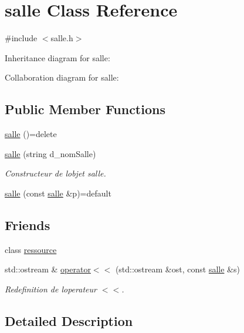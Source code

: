 \hypertarget{classsalle}{}\section{salle Class Reference}
\label{classsalle}


{\ttfamily \#include $<$salle.\+h$>$}



Inheritance diagram for salle\+:


Collaboration diagram for salle\+:
\subsection*{Public Member Functions}
\begin{DoxyCompactItemize}
\item 
\hyperlink{classsalle_afff557d088f3a88fea869c69c4a27034}{salle} ()=delete
\item 
\hyperlink{classsalle_a31f6417c7498ad8c11ca6d4a5a7fe756}{salle} (string d\+\_\+nom\+Salle)
\begin{DoxyCompactList}\small\item\em Constructeur de l\textquotesingle{}objet salle. \end{DoxyCompactList}\item 
\hyperlink{classsalle_ab6c4208e0e55d42c67880fa02e25f245}{salle} (const \hyperlink{classsalle}{salle} \&p)=default
\end{DoxyCompactItemize}
\subsection*{Friends}
\begin{DoxyCompactItemize}
\item 
class \hyperlink{classsalle_a24d55629351652ce27831ce9ef5194c9}{ressource}
\item 
std\+::ostream \& \hyperlink{classsalle_a79ce17cfc24c5a384d69f6269ae2fd36}{operator$<$$<$} (std\+::ostream \&ost, const \hyperlink{classsalle}{salle} \&s)
\begin{DoxyCompactList}\small\item\em Redefinition de l\textquotesingle{}operateur $<$$<$. \end{DoxyCompactList}\end{DoxyCompactItemize}


\subsection{Detailed Description}


